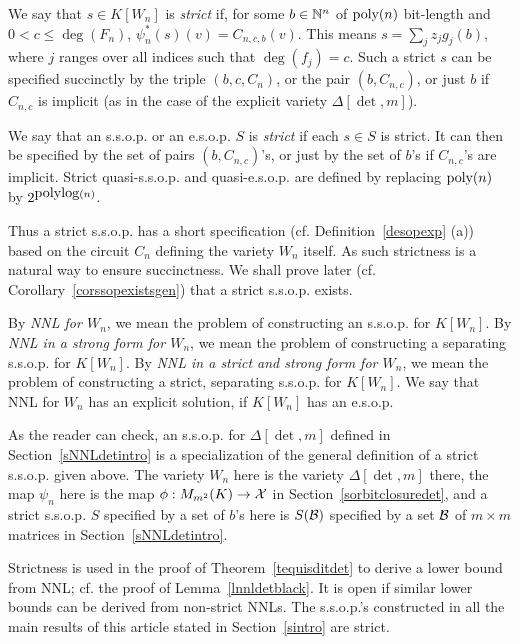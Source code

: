 \documentclass[11pt]{article}
\begin{document}
\begin{defn} \label{dstrict}
We say that  $s \in K[W_n]$ is {\em strict} if, for some $b\in \mathbb{N}^n$ 
of ${\mbox {poly}}(n)$ bit-length
and $0<c \le \deg(F_n)$,   $\psi_n^{*}(s)(v)=C_{n,c,b}(v)$. This means $s  = \sum_j z_j g_j(b)$,
where  $j$ ranges over all indices such that $\deg(f_j)=c$.
Such a strict $s$ can be specified succinctly by the triple  $(b,c, C_n)$, or the pair $(b,C_{n,c})$, or just $b$ if 
$C_{n,c}$ is implicit (as in the case of the explicit variety $\Delta[\det,m]$).

We say that  an s.s.o.p. or an e.s.o.p. $S$ is {\em strict} if each $s\in S$ is strict.
It can then be specified by the set of pairs $(b,C_{n,c})$'s, or just by the set of $b$'s if $C_{n,c}$'s are implicit.
Strict quasi-s.s.o.p. and quasi-e.s.o.p. are 
defined by replacing ${\mbox {poly}}(n)$ by $2^{{\mbox {polylog}}(n)}$.
\end{defn}

Thus a strict  s.s.o.p. 
has a short specification (cf. Definition~\ref{desopexp} (a)) 
based on the circuit $C_n$ defining the variety $W_n$ itself.  As such
strictness  is a natural way to ensure succinctness. 
We shall prove  later (cf. Corollary~\ref{corssopexistsgen}) that a strict s.s.o.p. exists.

By {\em NNL for $W_n$}, we mean the problem of constructing an s.s.o.p. for $K[W_n]$.
By {\em NNL in a strong form  for $W_n$}, we mean the problem of constructing a separating  s.s.o.p. for $K[W_n]$.
By {\em NNL in a strict and strong form  for $W_n$}, we mean the problem of constructing a strict, separating  s.s.o.p. for $K[W_n]$.
We say that  NNL for $W_n$ has an explicit solution, if $K[W_n]$ has an e.s.o.p.

As the reader can check, an s.s.o.p. for $\Delta[\det,m]$ defined in Section~\ref{sNNLdetintro} is a specialization of the 
general definition of a strict s.s.o.p. given above.
The variety $W_n$ here is the variety $\Delta[\det,m]$ there, the map $\psi_n$ here is the map $\phi: M_{m^2}(K) \rightarrow {\cal X}$ in Section~\ref{sorbitclosuredet},
and a strict s.s.o.p. $S$  specified by a set of $b$'s here is  $S({\cal B})$ specified by
a set ${\cal B}$ of $m\times m$ matrices in Section~\ref{sNNLdetintro}.

Strictness is used in the proof of  Theorem~\ref{tequisditdet} to derive
a lower bound from  NNL; cf. the proof of Lemma~\ref{lnnldetblack}.
It is open  if similar lower bounds can be derived from non-strict NNLs.
The s.s.o.p.'s constructed in all the main results of this article 
stated in Section~\ref{sintro} are strict. 
\end{document}
